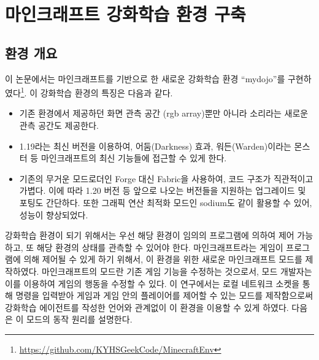 \documentclass[oneside, under, ko]{snuthesis}
\begin{document}
\chapter{마인크래프트 강화학습 환경 구축}
\section{환경 개요}
이 논문에서는 마인크래프트를 기반으로 한 새로운 강화학습 환경 “mydojo”를 구현하였다\footnote{\url{https://github.com/KYHSGeekCode/MinecraftEnv}}. 이 강화학습 환경의 특징은 다음과 같다.
\begin{itemize}
    \item 기존 환경에서 제공하던 화면 관측 공간 (rgb array)뿐만 아니라 소리라는 새로운 관측 공간도 제공한다.
    \item 1.19라는 최신 버전을 이용하여, 어둠(Darkness) 효과, 워든(Warden)이라는 몬스터 등 마인크래프트의 최신 기능들에 접근할 수 있게 한다.
    \item 기존의 무거운 모드로더인 Forge 대신 Fabric을 사용하여, 코드 구조가 직관적이고 가볍다. 이에 따라 1.20 버전 등 앞으로 나오는 버전들을 지원하는 업그레이드 및 포팅도 간단하다. 또한 그래픽 연산 최적화 모드인 sodium도 같이 활용할 수 있어, 성능이 향상되었다.
\end{itemize}
강화학습 환경이 되기 위해서는 우선 해당 환경이 임의의 프로그램에 의하여 제어 가능하고, 또 해당 환경의 상태를 관측할 수 있어야 한다. 마인크래프트라는 게임이 프로그램에 의해 제어될 수 있게 하기 위해서, 이 환경을 위한 새로운 마인크래프트 모드를 제작하였다. 마인크래프트의 모드란 기존 게임 기능을 수정하는 것으로서, 모드 개발자는 이를 이용하여 게임의 행동을 수정할 수 있다. 이 연구에서는 로컬 네트워크 소켓을 통해 명령을 입력받아 게임과 게임 안의 플레이어를 제어할 수 있는 모드를 제작함으로써 강화학습 에이전트를 작성한 언어와 관계없이 이 환경을 이용할 수 있게 하였다.
다음은 이 모드의 동작 원리를 설명한다.
\end{document}
